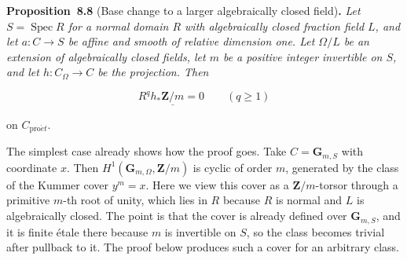 \documentclass[11pt]{article}
\newenvironment{bpstatement}[2]{\par\addvspace{0.6\baselineskip}\noindent\textbf{#1}#2\textbf{.}\enspace\ignorespaces}
  {\par\addvspace{0.4\baselineskip}}
\newenvironment{bpstatementit}[2]{\begin{bpstatement}{#1}{#2}\itshape\ignorespaces}{\end{bpstatement}}
\begin{document}
\label{bp668}%
\begin{bpstatementit}{Proposition~8.8}{ (Base change to a larger algebraically closed field)}
Let \(S=\operatorname{Spec}R\) for a normal domain \(R\) with algebraically closed fraction field \(L\), and let \(a:C\to S\) be affine and smooth of relative dimension one. Let \(\Omega/L\) be an extension of algebraically closed fields, let \(m\) be a positive integer invertible on \(S\), and let \(h:C_\Omega\to C\) be the projection. Then

\[
R^qh_*\underline{\mathbf Z/m}=0\qquad(q\geq1)
\]

on \(C_{\mathrm{pro}\acute{e}t}\).
\end{bpstatementit}

\label{bp669}%
The simplest case already shows how the proof goes. Take \(C=\mathbf G_{m,S}\) with coordinate \(x\). Then \(H^1(\mathbf G_{m,\Omega},\mathbf Z/m)\) is cyclic of order \(m\), generated by the class of the Kummer cover \(y^m=x\). Here we view this cover as a \(\mathbf Z/m\)-torsor through a primitive \(m\)-th root of unity, which lies in \(R\) because \(R\) is normal and \(L\) is algebraically closed. The point is that the cover is already defined over \(\mathbf G_{m,S}\), and it is finite étale there because \(m\) is invertible on \(S\), so the class becomes trivial after pullback to it. The proof below produces such a cover for an arbitrary class.
\end{document}
